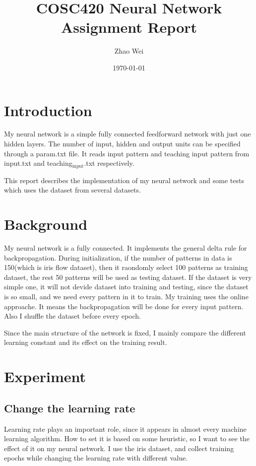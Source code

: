 \documentclass[11pt]{article}
\author{Zhao Wei}
\date{\today}
\title{COSC420 Neural Network Assignment Report}
\begin{document}
\maketitle
\tableofcontents


\section{Introduction}
\label{sec-1}
My neural network is a simple fully connected feedforward network with just one hidden layers. The number of input, hidden and output units can be specified through a param.txt file. It reads input pattern and teaching input pattern from input.txt and teaching$_{\text{input}}$.txt respectively. 

This report describes the implementation of my neural network and some tests which uses the dataset from several datasets. 
\section{Background}
\label{sec-2}
My neural network is a fully connected. It implements the general delta rule for backpropagation. During initialization, if the number of patterns in data is 150(which is iris flow dataset), then it raondomly select 100 patterns as training dataset, the rest 50 patterns will be used as testing dataset. If the dataset is very simple one, it will not devide dataset into training and testing, since the dataset is so small, and we need every pattern in it to train. My training uses the online approache. It means the backpropagation will be done for every input pattern. Also I shuffle the dataset before every epoch.

Since the main structure of the network is fixed, I mainly compare the different learning constant and its effect on the training result.
\section{Experiment}
\label{sec-3}
\subsection{Change the learning rate}
\label{sec-3-1}
Learning rate plays an important role, since it appears in almost every machine learning algorithm. How to set it is based on some heuristic, so I want to see the effect of it on my neural network. I use the iris dataset, and collect training epochs while changing the learning rate with different value.
\end{document}
